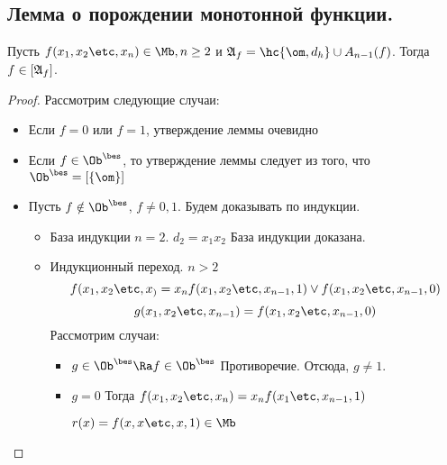 \documentclass[unicode,10pt]{article}
\begin{document}
\subsection{Лемма о порождении монотонной функции.}
\begin{lemma}
  Пусть $f(\set[x]{n}) \in \Mb, n \ge 2$ и $\ag_f=\hc{\om,d_h}\cup A_{n-1}(f)$.
  Тогда $f \in [\mathfrak{A}_f]$.
\end{lemma}
\begin{proof}
  Рассмотрим следующие случаи:
  \begin{itemize}
    \item
      Если $f=0$ или $f=1$, утверждение леммы очевидно
    \item
      Если $f \in \Oib$, то утверждение леммы следует из того, что
      \begin{math}
        \Oib=\cls{\om}
      \end{math}
    \item
      Пусть $f \notin \Oib$, $f\ne 0,1$. Будем доказывать по индукции.
      \begin{itemize}
        \item{База индукции $n=2$.}
          $d_2 = x_1x_2$ База индукции доказана.
        \item{Индукционный переход. $n>2$}
          \begin{displaymath}
            f(\set[x]) = x_nf(\set[x]{n-1},1)\vee f(\set[x]{n-1},0)
          \end{displaymath}
          \begin{displaymath}
            g(x_1,x_2\etc,x_{n-1}) = f(x_1,x_2\etc,x_{n-1},0)
          \end{displaymath}
          Рассмотрим случаи:\\
          \begin{itemize}
            \item
              \begin{math}
                g \in \Oib \Ra f \in \Oib
              \end{math}
              Противоречие. Отсюда, \WHY $g \ne 1$.
            \item {$g = 0$} Тогда
              \begin{math}
                f(\set[x]{n})=x_nf(\seti[x]{1}{n-1},1)
              \end{math}
              \begin{denote}
                \begin{math}
                  r(x)=f(x,x\etc,x,1) \in \Mb
                \end{math}

\end{denote}
\end{itemize}
\end{itemize}
\end{itemize}
\end{proof}
\end{document}
